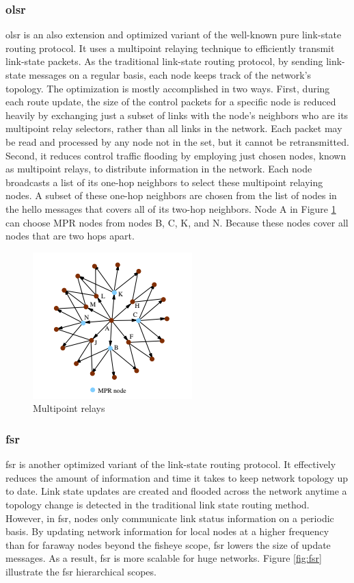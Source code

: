 \subsubsection{\acrfull{olsr}}
\acrfull{olsr} is an also extension and optimized variant of the well-known pure link-state routing protocol. It uses a multipoint relaying technique to efficiently transmit link-state packets. As the traditional link-state routing protocol, by sending link-state messages on a regular basis, each node keeps track of the network's topology. The optimization is mostly accomplished in two ways. First, during each route update, the size of the control packets for a specific node is reduced heavily by exchanging just a subset of links with the node's neighbors who are its multipoint relay selectors, rather than all links in the network. Each packet may be read and processed by any node not in the set, but it cannot be retransmitted. Second, it reduces control traffic flooding by employing just chosen nodes, known as multipoint relays, to distribute information in the network. Each node broadcasts a list of its one-hop neighbors to select these multipoint relaying nodes. A subset of these one-hop neighbors are chosen  from the list of nodes in the hello messages that covers all of its two-hop neighbors. Node A in Figure \ref{fig:multipoint relays} can choose MPR nodes from nodes B, C, K, and N. Because these nodes cover all nodes that are two hops apart.\cite{clausen2003optimized} \cite{clausen2003rfc3626}

\begin{figure}[!htb]
    \centering
    \includegraphics[scale=1]{images/olsr-mpr.png}
    \caption{Multipoint relays}
    \label{fig:multipoint relays}
\end{figure}

\subsubsection{\acrfull{fsr}}
\acrfull{fsr} is another optimized variant of the link-state routing protocol. It effectively reduces the amount of information and time it takes to keep network topology up to date. Link state updates are created and flooded across the network anytime a topology change is detected in the traditional link state routing method. However, in \acrshort{fsr}, nodes only communicate link status information on a periodic basis. By updating network information for local nodes at a higher frequency than for faraway nodes beyond the fisheye scope, \acrshort{fsr} lowers the size of update messages. As a result, \acrshort{fsr} is more scalable for huge networks. Figure \ref{fig:fsr} illustrate the \acrshort{fsr} hierarchical scopes.\cite{sathish2011comparative}

